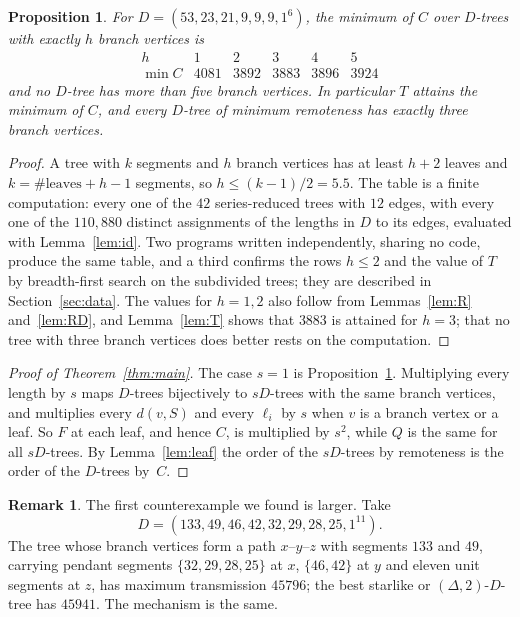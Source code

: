 \documentclass[11pt]{amsart}
\newtheorem{prop}[thm]{Proposition}
\theoremstyle{definition}
\newtheorem{remark}[thm]{Remark}
\begin{document}
\begin{prop}\label{prop:all}
For $D=(53,23,21,9,9,9,1^6)$, the minimum of $C$ over $D$-trees with exactly $h$ branch vertices is
\[
\begin{array}{c|ccccc}
h&1&2&3&4&5\\\hline
\min C&4081&3892&3883&3896&3924
\end{array}
\]
and no $D$-tree has more than five branch vertices. In particular $T$ attains the minimum of $C$, and every $D$-tree
of minimum remoteness has exactly three branch vertices.
\end{prop}

\begin{proof}
A tree with $k$ segments and $h$ branch vertices has at least $h+2$ leaves and $k=\#\text{leaves}+h-1$ segments, so
$h\le(k-1)/2=5.5$. The table is a finite computation: every one of the $42$ series-reduced trees with $12$ edges,
with every one of the $110{,}880$ distinct assignments of the lengths in $D$ to its edges, evaluated with
Lemma~\ref{lem:id}. Two programs written independently, sharing no code, produce the same table, and a third
confirms the rows $h\le2$ and the value of $T$ by breadth-first search on the subdivided trees; they are described in
Section~\ref{sec:data}. The values for $h=1,2$ also follow from Lemmas~\ref{lem:R} and~\ref{lem:RD}, and
Lemma~\ref{lem:T} shows that $3883$ is attained for $h=3$; that no tree with three branch vertices does better rests
on the computation.
\end{proof}

\begin{proof}[Proof of Theorem~\ref{thm:main}]
The case $s=1$ is Proposition~\ref{prop:all}. Multiplying every length by $s$ maps $D$-trees bijectively to
$sD$-trees with the same branch vertices, and multiplies every $d(v,S)$ and every $\ell_i$ by $s$ when $v$ is a branch
vertex or a leaf. So $F$ at each leaf, and hence $C$, is multiplied by $s^2$, while $Q$ is the same for all
$sD$-trees. By Lemma~\ref{lem:leaf} the order of the $sD$-trees by remoteness is the order of the $D$-trees by~$C$.
\end{proof}

\begin{remark}\label{rem:second}
The first counterexample we found is larger. Take
\[
D=(133,49,46,42,32,29,28,25,1^{11}).
\]
The tree whose branch vertices form a path $x$--$y$--$z$ with segments $133$ and $49$, carrying pendant segments $\{32,29,28,25\}$ at $x$,
$\{46,42\}$ at $y$ and eleven unit segments at $z$, has maximum transmission $45796$; the best starlike or
$(\Delta,2)$-$D$-tree has $45941$. The mechanism is the same.
\end{remark}
\end{document}
